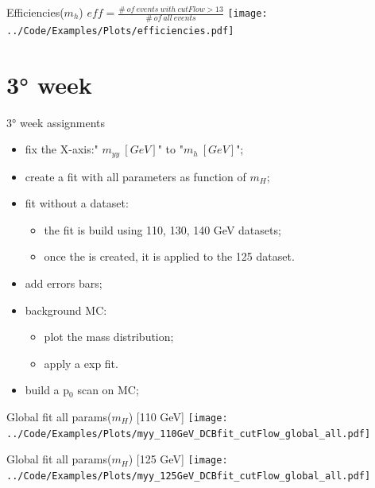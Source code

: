 \documentclass[10pt,UKenglish, leqno, xcolor = dvipsnames]{beamer}
\begin{document}
		\begin{frame}{Efficiencies($m_h$)}
			\vspace{.8cm}
			\centering
			$eff = \frac{\#\ of\ events\ with\ cutFlow>13}{\#\ of\ all\ events}$
			\vspace{2.5cm}
			\texttt{[image: ../Code/Examples/Plots/efficiencies.pdf]}
		\end{frame}
	
	\section{3° week}
	\SectionPage
	
		\begin{frame}{3° week assignments}
			\vfill
			\begin{itemize}
				\item fix the X-axis:" $m_{yy}\ [GeV]$" to "$m_{h}\ [GeV]$";
				\item create a fit with all parameters as function of $m_H$;
				\item fit without a dataset:
				\begin{itemize}
					\item the fit is build using 110, 130, 140 GeV datasets;
					\item once the is created, it is applied to the 125 dataset.
				\end{itemize}
				\item add errors bars;
				\item background MC:
				\begin{itemize}
					\item plot the mass distribution;
					\item apply a exp fit.
				\end{itemize}
				\item build a p$_{0}$ scan on MC;
			\end{itemize}
			\vfill
		\end{frame}
	
		\begin{frame}{Global fit all params($m_H$) [110 GeV]}
			\vfill
			\texttt{[image: ../Code/Examples/Plots/myy\_110GeV\_DCBfit\_cutFlow\_global\_all.pdf]}
			\vfill
		\end{frame}
	
		\begin{frame}{Global fit all params($m_H$) [125 GeV]}
			\vfill
			\texttt{[image: ../Code/Examples/Plots/myy\_125GeV\_DCBfit\_cutFlow\_global\_all.pdf]}
			\vfill
		\end{frame}
	
\end{document}
